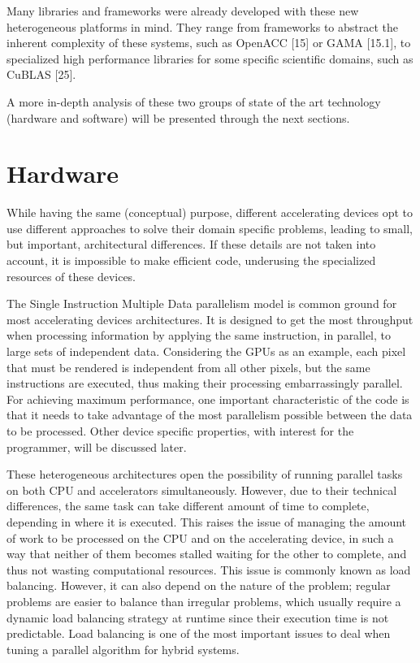 Many libraries and frameworks were already developed with these new heterogeneous platforms in mind. They range from frameworks to abstract the inherent complexity of these systems, such as OpenACC [15] or GAMA [15.1], to specialized high performance libraries for some specific scientific domains, such as CuBLAS [25].

A more in-depth analysis of these two groups of state of the art technology (hardware and software) will be presented through the next sections.

\section{Hardware}

While having the same (conceptual) purpose, different accelerating devices opt to use different approaches to solve their domain specific problems, leading to small, but important, architectural differences. If these details are not taken into account, it is impossible to make efficient code, underusing the specialized resources of these devices.

The Single Instruction Multiple Data parallelism model is common ground for most accelerating devices architectures. It is designed to get the most throughput when processing information by applying the same instruction, in parallel, to large sets of independent data. Considering the GPUs as an example, each pixel that must be rendered is independent from all other pixels, but the same instructions are executed, thus making their processing embarrassingly parallel. For achieving maximum performance, one important characteristic of the code is that it needs to take advantage of the most parallelism possible between the data to be processed. Other device specific properties, with interest for the programmer, will be discussed later.

These heterogeneous architectures open the possibility of running parallel tasks on both CPU and accelerators simultaneously. However, due to their technical differences, the same task can take different amount of time to complete, depending in where it is executed. This raises the issue of managing the amount of work to be processed on the CPU and on the accelerating device, in such a way that neither of them becomes stalled waiting for the other to complete, and thus not wasting computational resources. This issue is commonly known as load balancing. However, it can also depend on the nature of the problem; regular problems are easier to balance than irregular problems, which usually require a dynamic load balancing strategy at runtime since their execution time is not predictable. Load balancing is one of the most important issues to deal when tuning a parallel algorithm for hybrid systems.

